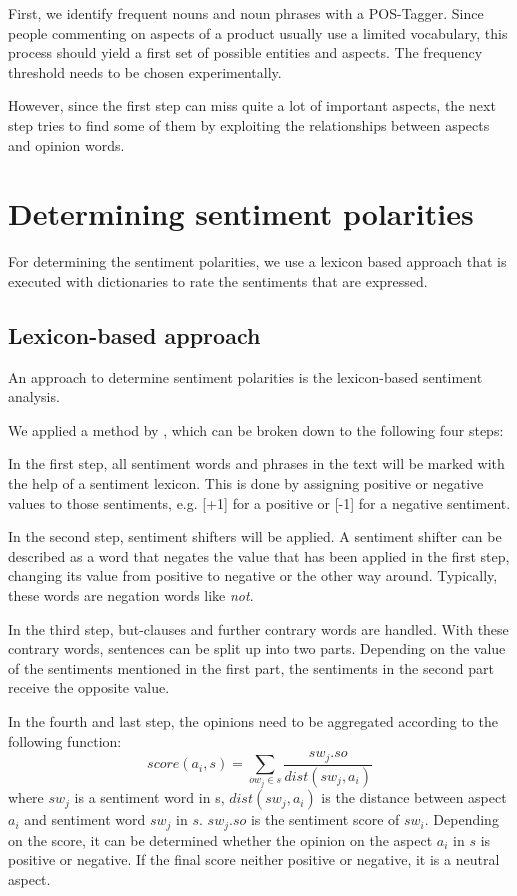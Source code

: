 \documentclass[10pt,a4paper]{article}
\begin{document}
	First, we identify frequent nouns and noun phrases with a POS-Tagger. Since people commenting on aspects of a product usually use a limited vocabulary, this process should yield a first set of possible entities and aspects. The frequency threshold needs to be chosen experimentally.
	
	However, since the first step can miss quite a lot of important aspects, the next step tries to find some of them by exploiting the relationships between aspects and opinion words.
	
	
	\section{Determining sentiment polarities}
	For determining the sentiment polarities, we use a lexicon based approach that is executed with dictionaries to rate the sentiments that are expressed.
	
		\subsection{Lexicon-based approach}
		An approach to determine sentiment polarities is the lexicon-based sentiment analysis.
		
		We applied a method by \cite{Ding:2008:HLA:1341531.1341561}, which can be broken down to the following four steps: 
		
		In the first step, all sentiment words and phrases in the text will be marked with the help of a sentiment lexicon. This is done by assigning positive or negative values to those sentiments, e.g. [+1] for a positive or [-1] for a negative sentiment.
		
		In the second step, sentiment shifters will be applied. A sentiment shifter can be described as a word that negates the value that has been applied in the first step, changing its value from positive to negative or the other way around. Typically, these words are negation words like \textit{not}. 
		
		In the third step, but-clauses and further contrary words are handled. With these contrary words, sentences can be split up into two parts. Depending on the value of the sentiments mentioned in the first part, the sentiments in the second part receive the opposite value.
		
		In the fourth and last step, the opinions need to be aggregated according to the following function:
		\begin{displaymath}
			score(a_i,s) = \sum_{ow_j \in s} \frac{sw_j.so}{dist(sw_j,a_i)}
		\end{displaymath}
		where $sw_j$ is a sentiment word in s, $dist(sw_j, a_i)$ is the distance between aspect $a_i$ and sentiment word $sw_j$ in $s$. $sw_j.so$ is the sentiment score of $sw_i$.  Depending on the score, it can be determined whether the opinion on the aspect $a_i$ in $s$ is positive or negative. If the final score neither positive or negative, it is a neutral aspect.
	
\end{document}
